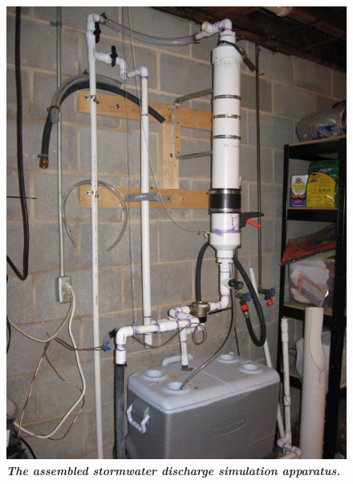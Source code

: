 \begin{center}
\begin{figure}
 \centering\includegraphics[scale=1.25]{dischargerPhoto.jpg}
 \caption[Stormwater Discharge Simulator]{\textbf{\emph{The assembled stormwater discharge simulation apparatus.}}\label{dischargerPhoto}}
\end{figure}
\end{center}

